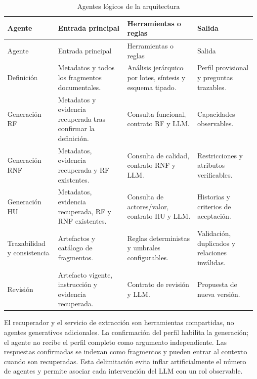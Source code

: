 \begin{longtable}{p{3.0cm}p{4.0cm}p{3.8cm}p{3.0cm}}
  \caption{Agentes lógicos de la arquitectura}
  \label{tab:agentes-arquitectura}\\
  \toprule
  Agente & Entrada principal & Herramientas o reglas & Salida \\
  \midrule
  \endfirsthead
  \toprule
  Agente & Entrada principal & Herramientas o reglas & Salida \\
  \midrule
  \endhead
  Definición & Metadatos y todos los fragmentos documentales. & Análisis jerárquico por lotes, síntesis y esquema tipado. & Perfil provisional y preguntas trazables. \\
  Generación RF & Metadatos y evidencia recuperada tras confirmar la definición. & Consulta funcional, contrato RF y LLM. & Capacidades observables. \\
  Generación RNF & Metadatos, evidencia recuperada y RF existentes. & Consulta de calidad, contrato RNF y LLM. & Restricciones y atributos verificables. \\
  Generación HU & Metadatos, evidencia recuperada, RF y RNF existentes. & Consulta de actores/valor, contrato HU y LLM. & Historias y criterios de aceptación. \\
  Trazabilidad y consistencia & Artefactos y catálogo de fragmentos. & Reglas deterministas y umbrales configurables. & Validación, duplicados y relaciones inválidas. \\
  Revisión & Artefacto vigente, instrucción y evidencia recuperada. & Contrato de revisión y LLM. & Propuesta de nueva versión. \\
  \bottomrule
\end{longtable}

El recuperador y el servicio de extracción son herramientas compartidas, no agentes generativos adicionales. La confirmación del perfil habilita la generación; el agente no recibe el perfil completo como argumento independiente. Las respuestas confirmadas se indexan como fragmentos  y pueden entrar al contexto cuando son recuperadas. Esta delimitación evita inflar artificialmente el número de agentes y permite asociar cada intervención del LLM con un rol observable.

